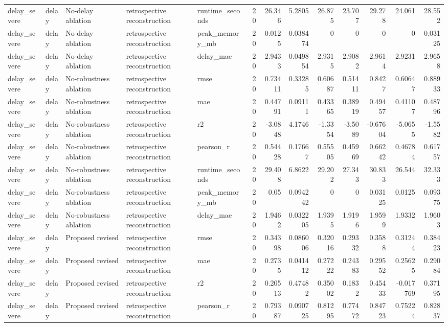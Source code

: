 \begin{table}[!htbp]
{{\begin{tabular}{lllllrrrrrrrr}
delay_severe & delay & No-delay ablation & retrospective reconstruction & runtime_seconds & 20 & 26.346 & 5.2805 & 26.875 & 23.707 & 29.278 & 24.061 & 28.552 \\
delay_severe & delay & No-delay ablation & retrospective reconstruction & peak_memory_mb & 20 & 0.0125 & 0.038474 & 0 & 0 & 0 & 0 & 0.03125 \\
delay_severe & delay & No-delay ablation & retrospective reconstruction & delay_mae & 20 & 2.9433 & 0.049854 & 2.9315 & 2.9082 & 2.9614 & 2.9231 & 2.9658 \\
delay_severe & delay & No-robustness ablation & retrospective reconstruction & rmse & 20 & 0.73411 & 0.33285 & 0.60687 & 0.51411 & 0.8427 & 0.60647 & 0.88933 \\
delay_severe & delay & No-robustness ablation & retrospective reconstruction & mae & 20 & 0.44791 & 0.09111 & 0.43365 & 0.38919 & 0.49457 & 0.41107 & 0.48796 \\
delay_severe & delay & No-robustness ablation & retrospective reconstruction & r2 & 20 & -3.0848 & 4.1746 & -1.3354 & -3.5089 & -0.67604 & -5.0655 & -1.5582 \\
delay_severe & delay & No-robustness ablation & retrospective reconstruction & pearson_r & 20 & 0.54428 & 0.17667 & 0.55505 & 0.45969 & 0.66242 & 0.46784 & 0.61757 \\
delay_severe & delay & No-robustness ablation & retrospective reconstruction & runtime_seconds & 20 & 29.408 & 6.8622 & 29.202 & 27.343 & 30.833 & 26.544 & 32.333 \\
delay_severe & delay & No-robustness ablation & retrospective reconstruction & peak_memory_mb & 20 & 0.05 & 0.094242 & 0 & 0 & 0.03125 & 0.0125 & 0.09375 \\
delay_severe & delay & No-robustness ablation & retrospective reconstruction & delay_mae & 20 & 1.9462 & 0.032205 & 1.9395 & 1.9196 & 1.9599 & 1.9332 & 1.9603 \\
delay_severe & delay & Proposed revised & retrospective reconstruction & rmse & 20 & 0.34398 & 0.086006 & 0.32016 & 0.29332 & 0.3588 & 0.31244 & 0.38423 \\
delay_severe & delay & Proposed revised & retrospective reconstruction & mae & 20 & 0.2735 & 0.041412 & 0.27222 & 0.24383 & 0.29552 & 0.25625 & 0.29084 \\
delay_severe & delay & Proposed revised & retrospective reconstruction & r2 & 20 & 0.20513 & 0.47482 & 0.35002 & 0.1832 & 0.45433 & -0.017769 & 0.37195 \\
delay_severe & delay & Proposed revised & retrospective reconstruction & pearson_r & 20 & 0.79387 & 0.090725 & 0.81295 & 0.77472 & 0.84723 & 0.75224 & 0.82837 \\

\end{tabular}}}
\end{table}
